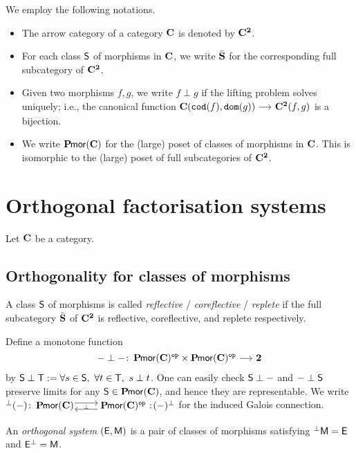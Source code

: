 \documentclass[a4paper,dvipsnames, 11pt]{amsart} %
\begin{document}
\maketitle
\begin{notation}
	We employ the following notations. 
	\begin{itemize}
		\item %
			The arrow category of a category $\mathbf{C}$ is denoted by $\mathbf{C}^{\mathbf{2}}$.
		\item %
			For each class $\mathsf{S}$ of morphisms in $\mathbf{C}$,
			we write $\bar{\mathbf{S}}$ for the corresponding full subcategory of $\mathbf{C}^{\mathbf{2}}$.
		\item %
			Given two morphisms $f,g$, we write $f\perp g$
			if the lifting problem solves uniquely; i.e.,
			the canonical function $\one{C}(\cod(f),\dom(g))\arr\one{C}^\ra(f,g)$ is a bijection.
		\item %
			We write $\operatorname{\mathbf{P}\hspace{-.1em}\mathsf{mor}}(\mathbf{C})$ for the (large) poset of classes of morphisms in $\mathbf{C}$.
			This is isomorphic to the (large) poset of full subcategories of $\mathbf{C}^{\mathbf{2}}$.
		\qedhere %
	\end{itemize}
\end{notation}
\section{Orthogonal factorisation systems}
Let $\mathbf{C}$ be a category.
\subsection{Orthogonality for classes of morphisms}
\begin{definition}
	A class $\mathsf{S}$ of morphisms is called \emph{reflective} / \emph{coreflective} / \emph{replete} if
	the full subcategory $\bar{\mathbf{S}}$ of $\mathbf{C}^{\mathbf{2}}$ is reflective, coreflective, and replete respectively.
\end{definition}
\begin{definition}
	Define a monotone function
	\[
		-\perp-
		\colon
		\Pmor(\one{C})^\op
		\times
		\Pmor(\one{C})^\op
		\arr
		\ra
	\]
	by $\mathsf{S}\perp\mathsf{T}:=\forall s\in\mathsf{S},\ \forall t\in\mathsf{T},\ s\perp t$.
	One can easily check $\mathsf{S}\perp-$ and $-\perp \mathsf{S}$ preserve limits for any $\mathsf{S}\in\operatorname{\mathbf{P}\hspace{-.1em}\mathsf{mor}}(\mathbf{C})$,
	and hence they are representable. We write $\llpo{(-)}\colon\Pmor(\one{C})\adjmap\Pmor(\one{C})^\op\lon\rlpo{(-)}$ for the induced Galois connection.
\end{definition}
\begin{definition}
	An \emph{orthogonal system} $(\mathsf{E},\mathsf{M})$ is a pair of classes of morphisms
	satisfying ${{}^\perp\mathsf{M}}=\mathsf{E}$ and ${\mathsf{E}^{\perp}}=\mathsf{M}$.
\end{definition}
\begin{proposition}
\end{proposition}
\end{document}
